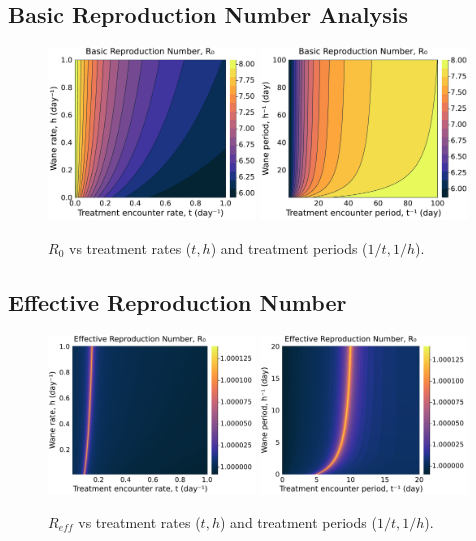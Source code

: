 \documentclass{article}
\begin{document}
\subsection{Basic Reproduction Number Analysis}
\begin{figure}[H]
    \centering
    \includegraphics[width=0.49\textwidth]{../../fig/brn_txh_heatmap.pdf}
    \includegraphics[width=0.49\textwidth]{../../fig/brn_txh_heatmap_rev.pdf}
    \caption{$R_0$ vs treatment rates ($t,h$) and treatment periods ($1/t,1/h$).}
\end{figure}

\subsection{Effective Reproduction Number}
\begin{figure}[H]
    \centering
    \includegraphics[width=0.49\textwidth]{../../fig/ern_txh_heatmap.pdf}
    \includegraphics[width=0.49\textwidth]{../../fig/ern_txh_heatmap_rev.pdf}
    \caption{$R_{eff}$ vs treatment rates ($t,h$) and treatment periods ($1/t,1/h$).}
\end{figure}
\end{document}

